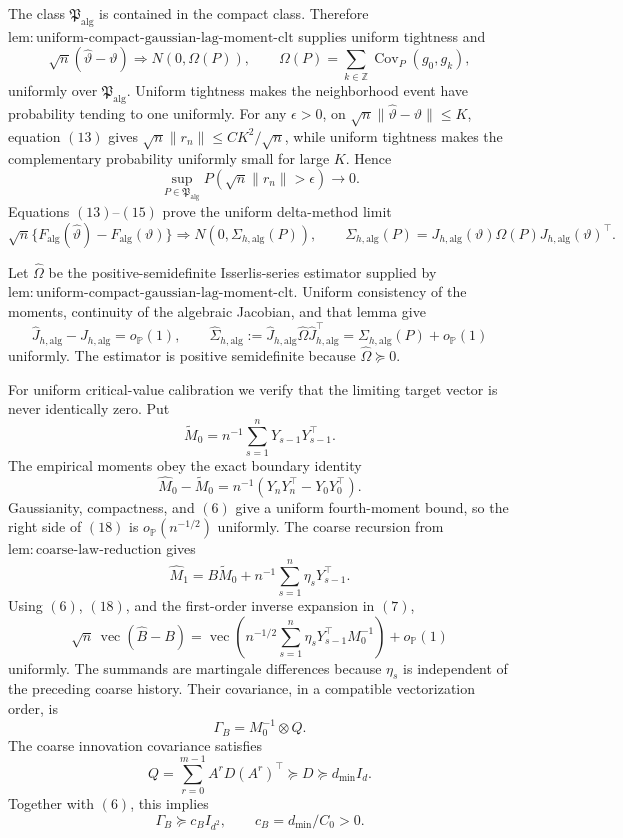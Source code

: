 The class \(\mathfrak P_{\mathrm{alg}}\) is contained in the compact class.  Therefore \(\mathrm{lem{:}uniform\mbox{-}compact\mbox{-}gaussian\mbox{-}lag\mbox{-}moment\mbox{-}clt}\) supplies uniform tightness and
\[
 \sqrt n(\widehat\vartheta-\vartheta)
 \Longrightarrow N(0,\Omega(P)),
 \qquad
 \Omega(P)=\sum_{k\in\mathbb Z}\operatorname{Cov}_P(g_0,g_k),
\tag{14}
\]
uniformly over \(\mathfrak P_{\mathrm{alg}}\).  Uniform tightness makes the neighborhood event have probability tending to one uniformly.  For any \(\epsilon>0\), on
\(\sqrt n\|\widehat\vartheta-\vartheta\|\le K\), equation \((13)\) gives \(\sqrt n\|r_n\|\le CK^2/\sqrt n\), while uniform tightness makes the complementary probability uniformly small for large \(K\).  Hence
\[
 \sup_{P\in\mathfrak P_{\mathrm{alg}}}
 P\!\left(\sqrt n\|r_n\|>\epsilon\right)\longrightarrow0.
\tag{15}
\]
Equations \((13)\)--\((15)\) prove the uniform delta-method limit
\[
 \sqrt n\{F_{\mathrm{alg}}(\widehat\vartheta)-F_{\mathrm{alg}}(\vartheta)\}
 \Longrightarrow N(0,\Sigma_{h,\mathrm{alg}}(P)),
 \qquad
 \Sigma_{h,\mathrm{alg}}(P)
 =J_{h,\mathrm{alg}}(\vartheta)\Omega(P)J_{h,\mathrm{alg}}(\vartheta)^\top.
\tag{16}
\]

Let \(\widehat\Omega\) be the positive-semidefinite Isserlis-series estimator supplied by \(\mathrm{lem{:}uniform\mbox{-}compact\mbox{-}gaussian\mbox{-}lag\mbox{-}moment\mbox{-}clt}\).  Uniform consistency of the moments, continuity of the algebraic Jacobian, and that lemma give
\[
 \widehat J_{h,\mathrm{alg}}-J_{h,\mathrm{alg}}=o_{\mathbb P}(1),
 \qquad
 \widehat\Sigma_{h,\mathrm{alg}}
 :=\widehat J_{h,\mathrm{alg}}\widehat\Omega\widehat J_{h,\mathrm{alg}}^\top
 =\Sigma_{h,\mathrm{alg}}(P)+o_{\mathbb P}(1)
\tag{17}
\]
uniformly.  The estimator is positive semidefinite because \(\widehat\Omega\succeq0\).

For uniform critical-value calibration we verify that the limiting target vector is never identically zero.  Put
\[
 \widetilde M_0=n^{-1}\sum_{s=1}^{n}Y_{s-1}Y_{s-1}^\top.
\]
The empirical moments obey the exact boundary identity
\[
 \widehat M_0-\widetilde M_0
 =n^{-1}(Y_nY_n^\top-Y_0Y_0^\top).
\tag{18}
\]
Gaussianity, compactness, and \((6)\) give a uniform fourth-moment bound, so the right side of \((18)\) is \(o_{\mathbb P}(n^{-1/2})\) uniformly.  The coarse recursion from \(\mathrm{lem{:}coarse\mbox{-}law\mbox{-}reduction}\) gives
\[
 \widehat M_1
 =B\widetilde M_0+n^{-1}\sum_{s=1}^{n}\eta_sY_{s-1}^\top.
\]
Using \((6)\), \((18)\), and the first-order inverse expansion in \((7)\),
\[
 \sqrt n\,\operatorname{vec}(\widehat B-B)
 =\operatorname{vec}\!\left(
 n^{-1/2}\sum_{s=1}^{n}\eta_sY_{s-1}^\top M_0^{-1}
 \right)+o_{\mathbb P}(1)
\tag{19}
\]
uniformly.  The summands are martingale differences because \(\eta_s\) is independent of the preceding coarse history.  Their covariance, in a compatible vectorization order, is
\[
 \Gamma_B=M_0^{-1}\otimes Q.
\tag{20}
\]
The coarse innovation covariance satisfies
\[
 Q=\sum_{r=0}^{m-1}A^rD(A^r)^\top\succeq D\succeq d_{\min}I_d.
\]
Together with \((6)\), this implies
\[
 \Gamma_B\succeq c_BI_{d^2},
 \qquad c_B=d_{\min}/C_0>0.
\tag{21}
\]

